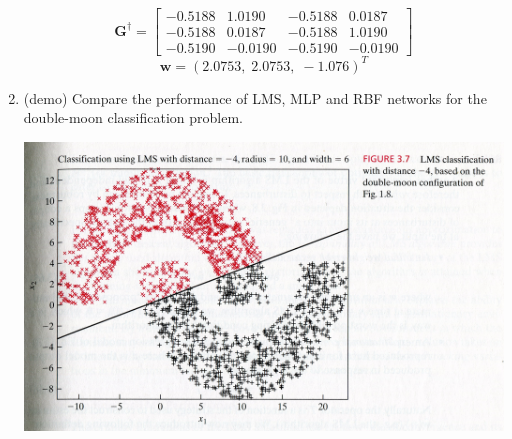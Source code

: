 \begin{enumerate}
\begin{solution}
    \begin{equation*}
      \mathbf{G}^\dagger=
      \left[
        \begin{array}{rrrr}
          -0.5188 & 1.0190 & -0.5188 &0.0187\\
          -0.5188 & 0.0187 & -0.5188 &1.0190\\
          -0.5190 & -0.0190 & -0.5190 &-0.0190
        \end{array}\right]
    \end{equation*}
    \begin{equation*}
      \mathbf{w}=(2.0753,\;2.0753,\;-1.076)^T
    \end{equation*}


  \end{solution}


\item (demo) Compare the performance of LMS, MLP and RBF networks for
  the double-moon classification problem.

  \begin{solution}
    \includegraphics[width=0.4\linewidth]{ex07_04_lms.jpg}
  \end{solution}
  


  
  



  
  
\end{enumerate}

